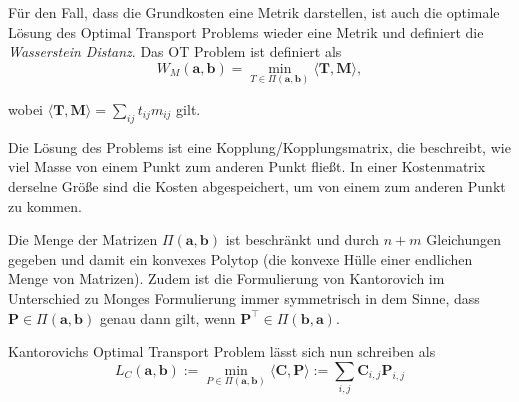 \documentclass[11pt,a4paper]{article}
\numberwithin{equation}{section}
\begin{document}
	
	
	Für den Fall, dass die Grundkosten eine Metrik darstellen, ist auch die optimale Lösung des Optimal Transport Problems wieder eine Metrik \cite{cuturi2014ground} und definiert die \textit{Wasserstein Distanz}. Das OT Problem ist definiert als
	\begin{equation}
	W_M(\boldsymbol{a},\boldsymbol{b}) = \min_{T \in \Pi(\boldsymbol{a}, \boldsymbol{b})}{\langle \boldsymbol{T}, \boldsymbol{M} \rangle},
	\end{equation}
	
	wobei ${\langle \boldsymbol{T}, \boldsymbol{M} \rangle} = \sum_{ij}{t_{ij}m_{ij}}$ gilt.
	
	Die Lösung des Problems ist eine Kopplung/Kopplungsmatrix, die beschreibt, wie viel Masse von einem Punkt zum anderen Punkt fließt. In einer Kostenmatrix derselne Größe sind die Kosten abgespeichert, um von einem zum anderen Punkt zu kommen.
	
	Die Menge der Matrizen $\Pi(\boldsymbol{a}, \boldsymbol{b})$ ist beschränkt und durch $n+m$ Gleichungen gegeben und damit ein konvexes Polytop (die konvexe Hülle einer endlichen Menge von Matrizen). Zudem ist die Formulierung von Kantorovich im Unterschied zu Monges Formulierung immer symmetrisch in dem Sinne, dass $\boldsymbol{P} \in \Pi (\boldsymbol{a}, \boldsymbol{b})$ genau dann gilt, wenn $\boldsymbol{P}^\top \in \Pi (\boldsymbol{b}, \boldsymbol{a})$.
	
	Kantorovichs Optimal Transport Problem lässt sich nun schreiben als 
	\begin{equation}
	L_C(\boldsymbol{a}, \boldsymbol{b}) := \min_{P \in \Pi(\boldsymbol{a}, \boldsymbol{b})} \langle \boldsymbol{C}, \boldsymbol{P} \rangle := \sum_{i,j}{\boldsymbol{C}_{i,j}\boldsymbol{P}_{i,j}} \label{KOTP}
	\end{equation}
	
\end{document}
